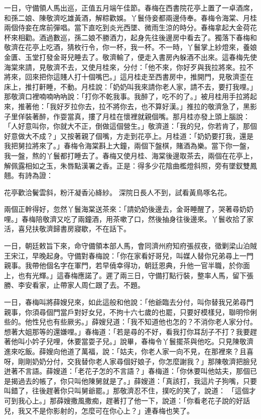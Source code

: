 \begin{showcontents}{}
一日，守備領人馬出巡，正值五月端午佳節。春梅在西書院花亭上置了一卓酒席，和孫二娘、陳敬濟吃雄黃酒，解粽歡娛。丫鬟侍妾都兩邊侍奉。春梅令海棠、月桂兩個侍妾在席前彈唱。當下直吃到炎光西墜、微雨生涼的時分。春梅拿起大金荷花杯來相勸。酒過數巡，孫二娘不勝酒力，起身先往後邊房中看去了。獨落下春梅和敬濟在花亭上吃酒，猜枚行令，你一杯，我一杯。不一時，丫鬟掌上紗燈來，養娘金匱、玉堂打發金哥兒睡去了。敬濟輸了，便走入書房內躲酒不出來。這春梅先使海棠來請，見敬濟不去，又使月桂來，分付：「他不來，你好歹與我拉將來。拉不將來，回來把你這賤人打十個嘴巴。」這月桂走至西書房中，推開門，見敬濟歪在床上，推打鼾睡，不動。月桂說：「奶奶叫我來請你老人家，請不去，要打我哩。」那敬濟口裡喃喃吶吶說：「打你不乾我事。我醉了，吃不的了。」被月桂用手拉將起來，推著他：「我好歹拉你去，拉不將你去，也不算好漢。」推拉的敬濟急了，黑影子里佯裝著醉，作耍當真，摟了月桂在懷裡就親個嘴。那月桂亦發上頭上腦說：「人好意叫你，你就大不正，倒做這個營生。」敬濟道：「我的兒，你若肯了，那個好意做大不成？」又按著親了個嘴，方走到花亭上。月桂道：「奶奶要打我，還是我把舅拉將來了。」春梅令海棠斟上大鐘，兩個下盤棋，賭酒為樂。當下你一盤，我一盤，熬的丫鬟都打睡去了。春梅又使月桂、海棠後邊取茶去，兩個在花亭上，解佩露相如之玉，朱唇點漢署之香。正是：得多少花陰曲檻燈斜照，旁有墜釵雙鳳翹。有詩為證：

花亭歡洽鬢雲斜，粉汗凝香沁絳紗。
深院日長人不到，試看黃鳥啄名花。

兩個正幹得好，忽然丫鬟海棠送茶來：「請奶奶後邊去，金哥睡醒了，哭著尋奶奶哩。」春梅陪敬濟又吃了兩鐘酒，用茶嗽了口，然後抽身往後邊來。丫鬟收拾了家活，喜兒扶敬濟歸書房寢歇，不在話下。

一日，朝廷敕旨下來，命守備領本部人馬，會同濟州府知府張叔夜，徵剿梁山泊賊王宋江，早晚起身。守備對春梅說：「你在家看好哥兒，叫媒人替你兄弟尋上一門親事。我帶他個名字在軍門，若早僥幸得功，朝廷恩典，升他一官半職，於你面上，也有光輝。」這春梅應諾了。遲了兩三日，守備打點行裝，整率人馬，留下張勝、李安看家，止帶家人周仁跟了去。不題。

一日，春梅叫將薛嫂兒來，如此這般和他說：「他爺臨去分付，叫你替我兄弟尋門親事，你須尋個門當戶對好女兒，不拘十六七歲的也罷，只要好模樣兒，聯明伶俐些的。他性兒也有些厥劣。」薛嫂兒道：「我不知道他也怎的？不消你老人家分付。想著大姐那等的還嫌哩。」春梅道：「若是尋的不好，看我打你耳刮子不打？我要趕著他叫小妗子兒哩，休要當耍子兒。」說畢，春梅令丫鬟擺茶與他吃。只見陳敬濟進來吃飯。薛嫂向他道了萬福，說：「姑夫，你老人家一向不見，在那裡來？且喜呀，剛剛奶奶分付，交我替你老人家尋個好娘子，你怎麼謝我？」那陳敬濟把臉兒迸著不言語。薛嫂道：「老花子怎的不言語？」春梅道：「你休要叫他姑夫，那個已是揭過去的帳了，你只叫他陳舅就是了。」薛嫂道：「真該打，我這片子狗嘴，只要叫錯了，往後趕著你只叫舅爺罷。」那敬濟忍不住，撲吃的笑了，說道： 「這個才可到我心上。」那薛嫂撒風撒痴，趕著打了他一下，說道：「你看老花子說的好話兒，我又不是你影射的，怎麼可在你心上？」連春梅也笑了。


\end{showcontents}
